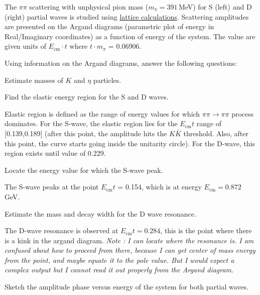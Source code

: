 
The $\pi\pi$ scattering with
unphysical pion mass ($m_\pi=391\,$MeV) for S (left) and D (right) partial waves
is studied using \href{https://inspirehep.net/literature/1618009}{lattice calculations}.
Scattering amplitudes are presented on the Argand diagrams
(parametric plot of energy in Real/Imaginary coordinates) as a function of energy of the system.
The value are given units of $E_\text{cm} \cdot t$ where $t \cdot m_\pi$ = 0.06906.


Using information on the Argand diagrams, answer the following questions:
\be
\item Estimate masses of $K$ and $\eta$ particles.\\
\item Find the elastic energy region for the S and D waves.\\
\begin{solution}
	Elastic region is defined as the range of energy values for which $\pi\pi \rightarrow \pi\pi$ process dominates. For the S-wave, the elastic region lies for the $E_\text{cm}t$ range of [0.139,0.189] (after this point, the amplitude hits the $K\bar{K}$ threshold. Also, after this point, the curve starts going inside the unitarity circle). For the D-wave, this region exists until value of 0.229.
\end{solution}
\item Locate the energy value for which the S-wave peak. \\
\begin{solution}
	The S-wave peaks at the point $E_\text{cm}t$ = 0.154, which is at energy $E_\text{cm} = 0.872$ GeV.
\end{solution}
\item Estimate the mass and decay width for the D wave resonance.\\
\begin{solution}
	The D-wave resonance is observed at $E_\text{cm}t = 0.284$, this is the point where there is a kink in the argand diagram. \textit{Note : I can locate where the resonance is. I am confused about how to proceed from there, because I can get center of mass energy from the point, and maybe equate it to the pole value. But I would expect a complex output but I cannot read it out properly from the Argand diagram}.
\end{solution}
\item Sketch the amplitude phase versus energy of the system for both partial waves.\\
\ee